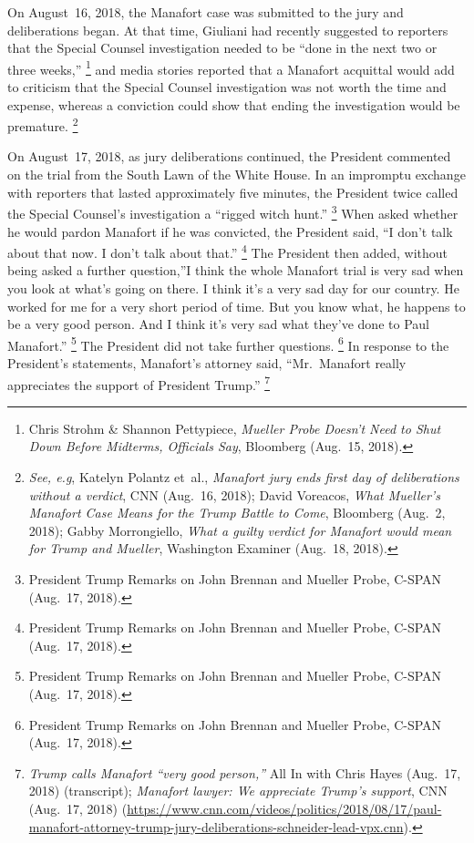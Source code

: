 On August~16, 2018, the Manafort case was submitted to the jury and deliberations began.
At that time, Giuliani had recently suggested to reporters that the Special Counsel investigation needed to be ``done in the next two or three weeks,''%
\footnote{Chris Strohm \& Shannon Pettypiece, \textit{Mueller Probe Doesn't Need to Shut Down Before Midterms, Officials Say}, Bloomberg (Aug.~15, 2018).}
and media stories reported that a Manafort acquittal would add to criticism that the Special Counsel investigation was not worth the time and expense, whereas a conviction could show that ending the investigation would be premature.%
\footnote{\textit{See, e.g}, Katelyn Polantz et~al., \textit{Manafort jury ends first day of deliberations without a verdict}, CNN (Aug.~16, 2018);
David Voreacos, \textit{What Mueller's Manafort Case Means for the Trump Battle to Come}, Bloomberg (Aug.~2, 2018);
Gabby Morrongiello, \textit{What a guilty verdict for Manafort would mean for Trump and Mueller}, Washington Examiner (Aug.~18, 2018).}

On August~17, 2018, as jury deliberations continued, the President commented on the trial from the South Lawn of the White House.
In an impromptu exchange with reporters that lasted approximately five minutes, the President twice called the Special Counsel's investigation a ``rigged witch hunt.''%
\footnote{President Trump Remarks on John Brennan and Mueller Probe, C-SPAN (Aug.~17, 2018).}
When asked whether he would pardon Manafort if he was convicted, the President said, ``I don't talk about that now.
I don't talk about that.''%
\footnote{President Trump Remarks on John Brennan and Mueller Probe, C-SPAN (Aug.~17, 2018).}
The President then added, without being asked a further question,''I think the whole Manafort trial is very sad when you look at what's going on there.
I think it's a very sad day for our country.
He worked for me for a very short period of time.
But you know what, he happens to be a very good person.
And I think it's very sad what they've done to Paul Manafort.''%
\footnote{President Trump Remarks on John Brennan and Mueller Probe, C-SPAN (Aug.~17, 2018).}
The President did not take further questions.%
\footnote{President Trump Remarks on John Brennan and Mueller Probe, C-SPAN (Aug.~17, 2018).}
In response to the President's statements, Manafort's attorney said, ``Mr.~Manafort really appreciates the support of President Trump.''%
\footnote{\textit{Trump calls Manafort ``very good person,''} All In with Chris Hayes (Aug.~17, 2018) (transcript);
\textit{Manafort lawyer: We appreciate Trump's support}, CNN (Aug.~17, 2018) (\url{https://www.cnn.com/videos/politics/2018/08/17/paul-manafort-attorney-trump-jury-deliberations-schneider-lead-vpx.cnn}).}

